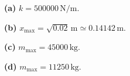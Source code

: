\noindent\textbf{(a)} \(k=500000\,\mathrm{N/m}\).

\noindent\textbf{(b)} \(x_{\max}=\sqrt{0.02}\,\mathrm m\simeq0.14142\,\mathrm m\).

\noindent\textbf{(c)} \(m_{\max}=45000\,\mathrm{kg}\).

\noindent\textbf{(d)} \(m_{\max}=11250\,\mathrm{kg}\).
